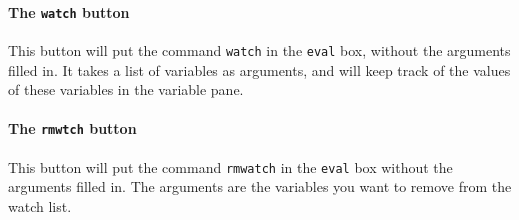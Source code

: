 \documentclass[a4paper,11pt]{book}
\begin{document}
\paragraph{The \texttt{watch} button}
This button will put the command \texttt{watch} in the
\texttt{eval} box, without the arguments
filled in.  It takes a list of variables as arguments, and will keep
track of the values of these variables in the variable pane.

\paragraph{The \texttt{rmwtch} button}
This button will put the command \texttt{rmwatch} in
the \texttt{eval} box without the arguments filled in.  The arguments
are the variables you want to remove from the watch list.
\end{document}
